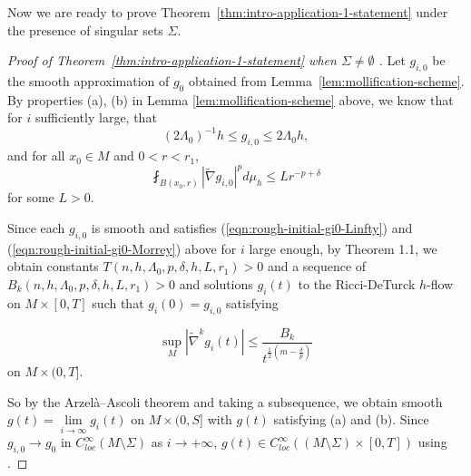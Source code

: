 \documentclass[12pt]{amsart}
\theoremstyle{plain}
\theoremstyle{plain}
\theoremstyle{definition}
\theoremstyle{remark}
\numberwithin{equation}{subsection}
\newcommand{\hdel}{\tilde{\nabla}}
\begin{document}
Now we are ready to prove Theorem~\ref{thm:intro-application-1-statement} under the presence of singular sets $\Sigma$.
\begin{proof}[Proof of Theorem~\ref{thm:intro-application-1-statement} when $\Sigma\neq \emptyset$ ]

Let $g_{i,0}$ be the smooth approximation of $g_0$ obtained from Lemma~\ref{lem:mollification-scheme}.   By properties (a), (b) in Lemma \ref{lem:mollification-scheme} above, we know that for $i$ sufficiently large, that
    \begin{equation}\label{eqn:rough-initial-gi0-Linfty}
        (2\Lambda_0)^{-1}h \leq g_{i,0} \leq 2\Lambda_0 h,
    \end{equation}
    and for all $x_0\in M$ and $0<r<r_1$,
    \begin{equation}\label{eqn:rough-initial-gi0-Morrey}
        \fint_{B(x_0, r)} |\hdel g_{i,0}|^p d\mu_h \leq L r^{-p+\delta}
    \end{equation}
    for some $L> 0$. 
    
    Since each $g_{i,0}$ is smooth and satisfies (\ref{eqn:rough-initial-gi0-Linfty}) and (\ref{eqn:rough-initial-gi0-Morrey}) above for $i$ large enough, by Theorem 1.1, we obtain constants $T(n,h,\Lambda_0,p,\delta,h,L,r_1) > 0$ and a sequence of $B_k(n,h,\Lambda_0,p,\delta,h,L,r_1) > 0$ and solutions $g_i(t)$ to the Ricci-DeTurck $h$-flow on $M \times [0,T]$ such that $g_i(0) = g_{i,0}$ satisfying

$$\sup\limits_{M}|\hdel^k g_i(t)| \leq \frac{B_k}{t^{\frac{1}{2}(m-\frac{\delta}{p})}}$$ on $M \times (0,T]$.

So by the Arzel\`a--Ascoli theorem and taking a subsequence, we obtain smooth $g(t) = \lim\limits_{i\to\infty}g_i(t)$ on $M \times (0,S]$ with $g(t)$ satisfying (a) and (b). Since $g_{i,0}\to g_0$ in $C^\infty_{loc}(M\setminus \Sigma)$ as $i\to+\infty$, $g(t)\in C^\infty_{loc}\left((M\setminus \Sigma)\times [0,T]\right)$ using \cite[Proposition 2.2]{chu_ricci-deturck_2022}. 


\end{proof}
\end{document}
